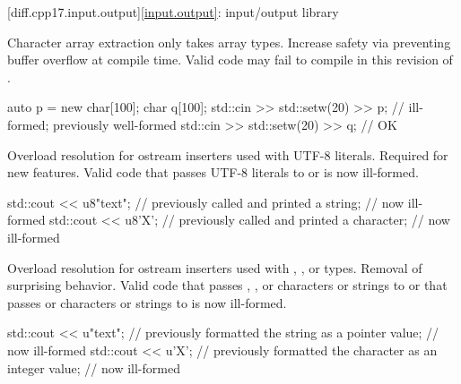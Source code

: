 [diff.cpp17.input.output]{\ref{input.output}: input/output library}

\change
Character array extraction only takes array types.
\rationale
Increase safety via preventing buffer overflow at compile time.
\effect
Valid \CppXVII{} code may fail to compile in this revision of \Cpp{}.
\begin{example}
\begin{codeblock}
auto p = new char[100];
char q[100];
std::cin >> std::setw(20) >> p;         // ill-formed; previously well-formed
std::cin >> std::setw(20) >> q;         // OK
\end{codeblock}
\end{example}

%
\change
Overload resolution for ostream inserters used with UTF-8 literals.
\rationale
Required for new features.
\effect
Valid \CppXVII{} code that passes UTF-8 literals to
 or
 is now ill-formed.
\begin{example}
\begin{codeblock}
std::cout << u8"text";          // previously called  and printed a string;
                                // now ill-formed
std::cout << u8'X';             // previously called  and printed a character;
                                // now ill-formed
\end{codeblock}
\end{example}

\change
Overload resolution for ostream inserters
used with , , or  types.
\rationale
Removal of surprising behavior.
\effect
Valid \CppXVII{} code that passes
, , or  characters or strings
to  or
that passes  or  characters or strings
to  is now ill-formed.
\begin{example}
\begin{codeblock}
std::cout << u"text";           // previously formatted the string as a pointer value;
                                // now ill-formed
std::cout << u'X';              // previously formatted the character as an integer value;
                                // now ill-formed
\end{codeblock}
\end{example}

